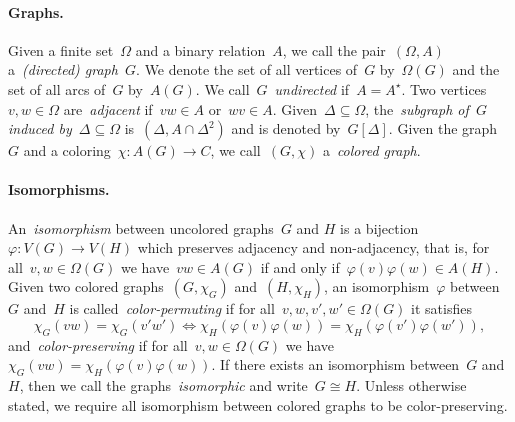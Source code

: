 \documentclass[english,a4paper]{article}
\theoremstyle{plain}
\theoremstyle{definition}
\newcommand{\vertices}{\ensuremath{\Omega}}
\newcommand{\arcs}{\ensuremath{A}}
\newcommand{\coloring}{\ensuremath{\chi}}
\begin{document}
\paragraph{Graphs.}
Given a finite set~$\vertices$ and a binary relation~$A$, we call the pair~$(\vertices, \arcs)$ a~\emph{(directed) graph~$G$}.
We denote the set of all vertices of~$G$ by~$\vertices(G)$ and the set of all arcs of~$G$ by~$\arcs(G)$.
We call~$G$~\emph{undirected} if~$\arcs = \arcs^\star$.
Two vertices~$v,w \in \vertices$ are~\emph{adjacent} if~$vw \in \arcs$ or~$wv \in \arcs$.
Given~$\Delta \subseteq \vertices$, the~\emph{subgraph of~$G$ induced by~$\Delta \subseteq \vertices$} is~$(\Delta, \arcs \cap \Delta^2)$ and is denoted by~$G[\Delta]$.
Given the graph~$G$ and a coloring~$\coloring \colon \arcs(G) \to C$, we call~$(G,\coloring)$ a~\emph{colored graph}.



\paragraph{Isomorphisms.}
An~\emph{isomorphism} between uncolored graphs~$G$ and $H$ is a bijection~$\varphi: V(G) \to V(H)$ which preserves adjacency and non-adjacency, that is, for all~$v,w \in \vertices(G)$ we have~$vw \in \arcs(G)$ if and only if~$\varphi(v)\varphi(w) \in \arcs(H)$.
Given two colored graphs~$(G,\coloring_G)$ and~$(H,\coloring_H)$, an isomorphism~$\varphi$ between~$G$ and~$H$ is called~\emph{color-permuting} if for all~$v,w,v',w' \in \vertices(G)$ it satisfies
\begin{equation*}
\label{eq:isomorphic-colored}
    \coloring_G(vw) = \coloring_G(v'w') \iff \coloring_H(\varphi(v)\varphi(w)) = \coloring_H(\varphi(v')\varphi(w')),
\end{equation*}
and~\emph{color-preserving} if for all~$v,w \in \vertices(G)$ we have~$\coloring_G(vw) = \coloring_H(\varphi(v)\varphi(w))$.
If there exists an isomorphism between~$G$ and~$H$, then we call the graphs~\emph{isomorphic} and write~$G \cong H$.
Unless otherwise stated, we require all isomorphism between colored graphs to be color-preserving.
\end{document}
